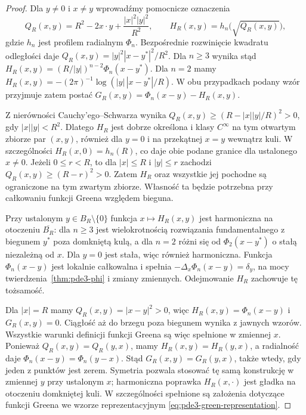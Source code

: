 \begin{proof}
Dla $y\ne0$ i $x\ne y$ wprowadźmy pomocnicze oznaczenia
\[
 Q_R(x,y)=R^2-2x\cdot y+\frac{|x|^2|y|^2}{R^2},
 \qquad H_R(x,y)=h_n\bigl(\sqrt{Q_R(x,y)}\bigr),
\]
gdzie $h_n$ jest profilem radialnym $\Phi_n$.
Bezpośrednie rozwinięcie kwadratu odległości daje
$Q_R(x,y)=|y|^2|x-y^*|^2/R^2$.
Dla $n\geq3$ wynika stąd
$H_R(x,y)=(R/|y|)^{n-2}\Phi_n(x-y^*)$.
Dla $n=2$ mamy
$H_R(x,y)=-(2\pi)^{-1}\log(|y|\,|x-y^*|/R)$.
W obu przypadkach podany wzór przyjmuje zatem postać
$G_R(x,y)=\Phi_n(x-y)-H_R(x,y)$.

Z nierówności Cauchy'ego--Schwarza wynika
$Q_R(x,y)\geq(R-|x||y|/R)^2>0$,
gdy $|x||y|<R^2$. Dlatego $H_R$ jest dobrze określona
i klasy $C^\infty$ na tym otwartym zbiorze par $(x,y)$,
również dla $y=0$ i na przekątnej $x=y$ wewnątrz kuli.
W szczególności $H_R(x,0)=h_n(R)$, co daje obie
podane granice dla ustalonego $x\ne0$.
Jeżeli $0\leq r<R$, to dla $|x|\leq R$ i $|y|\leq r$
zachodzi $Q_R(x,y)\geq(R-r)^2>0$.
Zatem $H_R$ oraz wszystkie jej pochodne są ograniczone
na tym zwartym zbiorze. Własność ta będzie potrzebna
przy całkowaniu funkcji Greena względem bieguna.

Przy ustalonym $y\in B_R\setminus\{0\}$ funkcja
$x\mapsto H_R(x,y)$ jest harmoniczna na otoczeniu
$\overline{B_R}$: dla $n\geq3$ jest wielokrotnością
rozwiązania fundamentalnego z biegunem $y^*$ poza
domkniętą kulą, a dla $n=2$ różni się od
$\Phi_2(x-y^*)$ o stałą niezależną od $x$.
Dla $y=0$ jest stała, więc również harmoniczna.
Funkcja $\Phi_n(x-y)$ jest lokalnie całkowalna
i spełnia $-\Delta_x\Phi_n(x-y)=\delta_y$,
na mocy twierdzenia~\ref{thm:pde3-phi} i zmiany zmiennych.
Odejmowanie $H_R$ zachowuje tę tożsamość.

Dla $|x|=R$ mamy $Q_R(x,y)=|x-y|^2>0$,
więc $H_R(x,y)=\Phi_n(x-y)$ i $G_R(x,y)=0$.
Ciągłość aż do brzegu poza biegunem wynika z jawnych
wzorów. Wszystkie warunki definicji funkcji Greena
są więc spełnione w zmiennej $x$.
Ponieważ $Q_R(x,y)=Q_R(y,x)$, mamy
$H_R(x,y)=H_R(y,x)$, a radialność daje
$\Phi_n(x-y)=\Phi_n(y-x)$. Stąd
$G_R(x,y)=G_R(y,x)$, także wtedy, gdy jeden z punktów
jest zerem. Symetria pozwala stosować tę samą konstrukcję
w zmiennej $y$ przy ustalonym $x$; harmoniczna poprawka
$H_R(x,\cdot)$ jest gładka na otoczeniu domkniętej kuli.
W szczególności spełnione są założenia dotyczące
funkcji Greena we wzorze reprezentacyjnym
\eqref{eq:pde3-green-representation}.
\end{proof}

